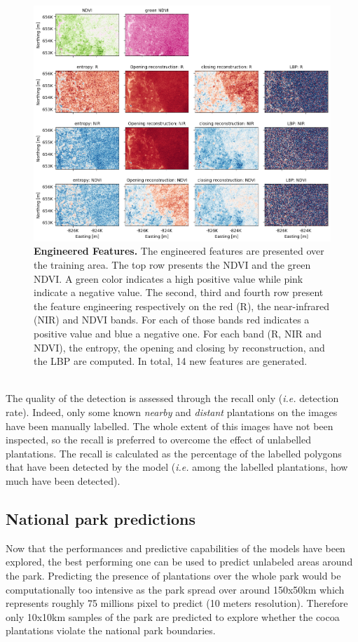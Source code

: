 \documentclass[a4paper, 12pt]{article}
\begin{document}
            \begin{figure}[t!]
                \centering
                \includegraphics[width=1\textwidth]{../Figures/Feature_Engineered.png}
                \caption{\textbf{Engineered Features.} The engineered features are presented over the training area. The top row presents the NDVI and the green NDVI. A green color indicates a high positive value while pink indicate a negative value. The second, third and fourth row present the feature engineering respectively on the red (R), the near-infrared (NIR) and NDVI bands. For each of those bands red indicates a positive value and blue a negative one. For each band (R, NIR and NDVI), the entropy, the opening and closing by reconstruction, and the LBP are computed. In total, 14 new features are generated.}
                \label{fig:feature_eng}
            \end{figure}
            \\
            The quality of the detection is assessed through the recall only (\textit{i.e.} detection rate). Indeed, only some known \textit{nearby} and \textit{distant} plantations on the images have been manually labelled. The whole extent of this images have not been inspected, so the recall is preferred to overcome the effect of unlabelled plantations. The recall is calculated as the percentage of the labelled polygons that have been detected by the model (\textit{i.e.} among the labelled plantations, how much have been detected).

    \subsection{National park predictions}
        Now that the performances and predictive capabilities of the models have been explored, the best performing one can be used to predict unlabeled areas around the park. Predicting the presence of plantations over the whole park would be computationally too intensive as the park spread over around 150x50km which represents roughly 75 millions pixel to predict (10 meters resolution). Therefore only 10x10km samples of the park are predicted to explore whether the cocoa plantations violate the national park boundaries.
\end{document}
